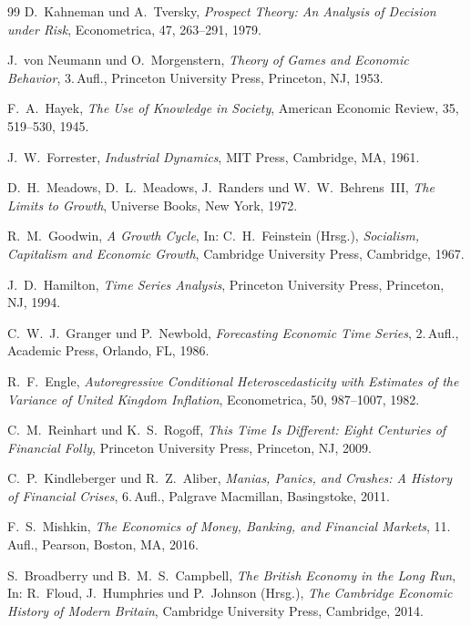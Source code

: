 \documentclass[a4paper,12pt,twoside]{report}
\theoremstyle{definition}
\begin{document}
\begin{thebibliography}{99}
	D.~Kahneman und A.~Tversky,
	\textit{Prospect Theory: An Analysis of Decision under Risk},
	Econometrica, 47, 263--291, 1979.

	J.~von Neumann und O.~Morgenstern,
	\textit{Theory of Games and Economic Behavior},
	3.\,Aufl., Princeton University Press, Princeton, NJ, 1953.

	F.~A.~Hayek,
	\textit{The Use of Knowledge in Society},
	American Economic Review, 35, 519--530, 1945.

	J.~W.~Forrester,
	\textit{Industrial Dynamics},
	MIT Press, Cambridge, MA, 1961.

	D.~H.~Meadows, D.~L.~Meadows, J.~Randers und W.~W.~Behrens~III,
	\textit{The Limits to Growth},
	Universe Books, New York, 1972.

	R.~M.~Goodwin,
	\textit{A Growth Cycle},
	In: C.~H.~Feinstein (Hrsg.), \textit{Socialism, Capitalism and Economic Growth},
	Cambridge University Press, Cambridge, 1967.

	J.~D.~Hamilton,
	\textit{Time Series Analysis},
	Princeton University Press, Princeton, NJ, 1994.

	C.~W.~J.~Granger und P.~Newbold,
	\textit{Forecasting Economic Time Series},
	2.\,Aufl., Academic Press, Orlando, FL, 1986.

	R.~F.~Engle,
	\textit{Autoregressive Conditional Heteroscedasticity with Estimates of the Variance of United Kingdom Inflation},
	Econometrica, 50, 987--1007, 1982.

	C.~M.~Reinhart und K.~S.~Rogoff,
	\textit{This Time Is Different: Eight Centuries of Financial Folly},
	Princeton University Press, Princeton, NJ, 2009.

	C.~P.~Kindleberger und R.~Z.~Aliber,
	\textit{Manias, Panics, and Crashes: A History of Financial Crises},
	6.\,Aufl., Palgrave Macmillan, Basingstoke, 2011.

	F.~S.~Mishkin,
	\textit{The Economics of Money, Banking, and Financial Markets},
	11.\,Aufl., Pearson, Boston, MA, 2016.

	S.~Broadberry und B.~M.~S.~Campbell,
	\textit{The British Economy in the Long Run},
	In: R.~Floud, J.~Humphries und P.~Johnson (Hrsg.), \textit{The Cambridge Economic History of Modern Britain},
	Cambridge University Press, Cambridge, 2014.


\end{thebibliography}
\end{document}
